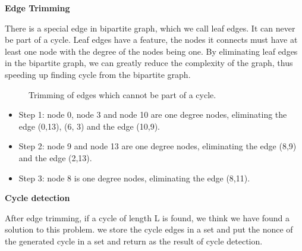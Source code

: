 \documentclass[a4paper,11pt]{article}
\begin{document}
\textbf{Edge Trimming}

There is a special edge in bipartite graph, which we call leaf edges. It can never be part of a cycle.
Leaf edges have a feature, the nodes it connects must have at least one node with the degree of the nodes being one.
By eliminating leaf edges in the bipartite graph, we can greatly reduce the complexity of the graph,
thus speeding up finding cycle from the bipartite graph.

\begin{figure}[h]
	\centerline{%
	}
	\caption{Trimming of edges which cannot be part of a cycle.}
\end{figure}

\begin{itemize}
	\item Step 1: node 0, node 3 and node 10 are one degree nodes, eliminating the edge (0,13), (6, 3) and the edge (10,9).
	\item Step 2: node 9 and node 13 are one degree nodes, eliminating the edge (8,9) and the edge (2,13).
	\item Step 3: node 8 is one degree nodes, eliminating the edge (8,11).
\end{itemize}


\textbf{Cycle detection}

After edge trimming, if a cycle of length L is found, we think we have found a solution to this problem.
we store the cycle edges in a set and put the nonce of the generated cycle in a set and
return as the result of cycle detection.
\end{document}
